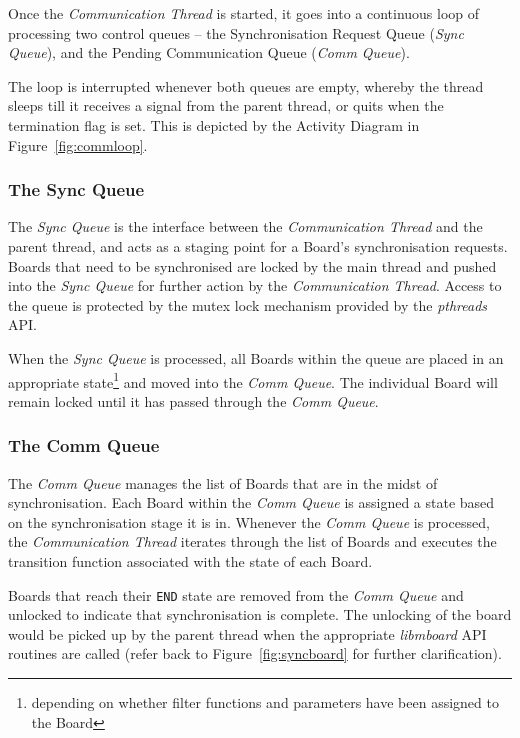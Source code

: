 Once the \textit{Communication Thread} is started, it goes into a continuous loop of processing two control queues -- the Synchronisation Request Queue (\textit{Sync Queue}), and the Pending Communication Queue (\textit{Comm Queue}). 

The loop is interrupted whenever both queues are empty, whereby the thread sleeps till it receives a signal from the parent thread, or quits when the termination flag is set. This is depicted by the Activity Diagram in Figure~\ref{fig:commloop}.

\subsubsection{The Sync Queue}
\label{sec:syncqueue}

The \textit{Sync Queue} is the interface between the \textit{Communication Thread} and the parent thread, and acts as a staging point for a Board's synchronisation requests. Boards that need to be synchronised are locked by the main thread and pushed into the \textit{Sync Queue} for further action by the \textit{Communication Thread}. Access to the queue is protected by the mutex lock mechanism provided by the \textit{pthreads} API.

When the \textit{Sync Queue} is processed, all Boards within the queue are placed in an appropriate state\footnote{depending on whether filter functions and parameters have been assigned to the Board} and moved into the \textit{Comm Queue}. The individual Board will remain locked until it has passed through the \textit{Comm Queue}.

\subsubsection{The Comm Queue}

The \textit{Comm Queue} manages the list of Boards that are in the midst of synchronisation. Each Board within the \textit{Comm Queue} is assigned a state based on the synchronisation stage it is in. Whenever the \textit{Comm Queue} is processed, the \textit{Communication Thread} iterates through the list of Boards and executes the transition function associated with the state of each Board. 

Boards that reach their \texttt{END} state are removed from the \textit{Comm Queue} and unlocked to indicate that synchronisation is complete. The unlocking of the board would be picked up by the parent thread when the appropriate \textit{libmboard} API routines are called (refer back to Figure~\ref{fig:syncboard} for further clarification).

